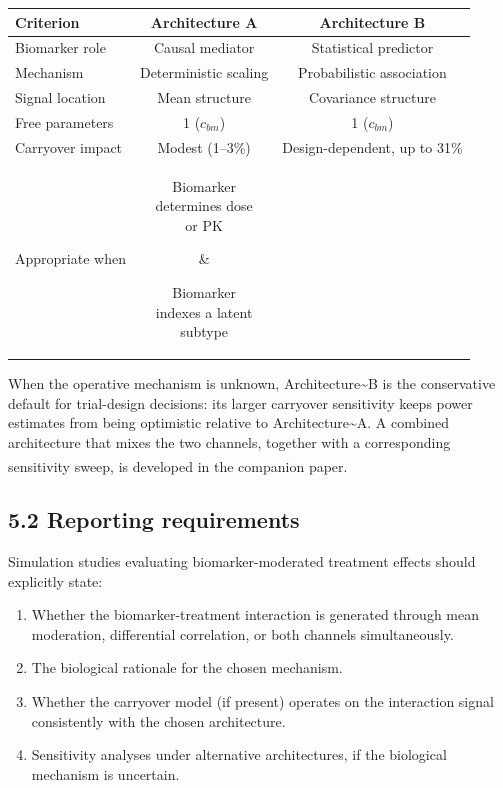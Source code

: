 \documentclass[
  11pt,
]{article}
\begin{document}
\begin{table}[htbp]
\centering
\begin{tabular}{lcc}
\toprule
Criterion & Architecture A & Architecture B \\
\midrule
Biomarker role   & Causal mediator       & Statistical predictor \\
Mechanism        & Deterministic scaling & Probabilistic association \\
Signal location  & Mean structure        & Covariance structure \\
Free parameters  & 1 ($c_{bm}$)          & 1 ($c_{bm}$) \\
Carryover impact & Modest (1--3\%)       & Design-dependent, up to 31\% \\
Appropriate when &
  \parbox[t]{3cm}{Biomarker\\determines dose\\or PK} &
  \parbox[t]{3cm}{Biomarker\\indexes a latent\\subtype} \\
\bottomrule
\end{tabular}
\end{table}

When the operative mechanism is unknown, Architecture\textasciitilde B
is the conservative default for trial-design decisions: its larger
carryover sensitivity keeps power estimates from being optimistic
relative to Architecture\textasciitilde A. A combined architecture that
mixes the two channels, together with a corresponding sensitivity sweep,
is developed in the companion
paper\textsuperscript{}.

\subsection{5.2 Reporting requirements}

Simulation studies evaluating biomarker-moderated treatment effects
should explicitly state:

\begin{enumerate}
\item Whether the biomarker-treatment interaction is generated through
  mean moderation, differential correlation, or both channels
  simultaneously.
\item The biological rationale for the chosen mechanism.
\item Whether the carryover model (if present) operates on the
  interaction signal consistently with the chosen architecture.
\item Sensitivity analyses under alternative architectures, if the
  biological mechanism is uncertain.
\end{enumerate}
\end{document}
